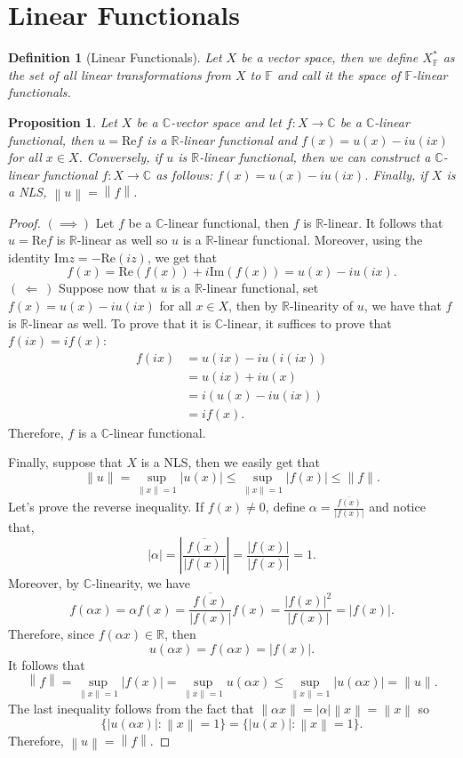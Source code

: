 \documentclass{article}
\newtheorem*{proposition}{Proposition}
\newtheorem*{definition}{Definition}
\newcommand{\C}{\mathbb{C}}
\newcommand{\R}{\mathbb{R}}
\newcommand{\F}{\mathbb{F}}
\newcommand{\norm}[1]{\left\lVert#1 \right\rVert}
\newcommand{\abs}[1]{\left\lvert#1 \right\rvert}
\renewcommand{\Im}{\text{Im}}
\renewcommand{\Re}{\text{Re}}
\begin{document}
\section{Linear Functionals}
\begin{definition}[Linear Functionals]
    Let $X$ be a vector space, then we define $X^*_{\F}$ as the set of all linear transformations from $X$ to $\F$ and call it the space of $\F$-linear functionals.
\end{definition}

\begin{proposition}
    Let $X$ be a $\C$-vector space and let $f : X \to \C$ be a $\C$-linear functional, then $u = \Re f$ is a $\R$-linear functional and $f(x) = u(x) - iu(ix)$ for all $x \in X$. Conversely, if $u$ is $\R$-linear functional, then we can construct a $\C$-linear functional $f : X \to \C$ as follows: $f(x) = u(x) - iu(ix)$. Finally, if $X$ is a NLS, $\norm{u} = \norm{f}$.
\end{proposition}

\begin{proof}
    $(\implies)$ Let $f$ be a $\C$-linear functional, then $f$ is $\R$-linear. It follows that $u = \Re f$ is $\R$-linear as well so $u$ is a $\R$-linear functional. Moreover, using the identity $\Im z = - \Re(iz)$, we get that
    $$f(x) = \Re (f(x)) + i \Im (f(x)) = u(x) - i u(ix).$$
    $( \ \Longleftarrow \ )$ Suppose now that $u$ is a $\R$-linear functional, set $f(x) = u(x) - iu(ix)$ for all $x \in X$, then by $\R$-linearity of $u$, we have that $f$ is $\R$-linear as well. To prove that it is $\C$-linear, it suffices to prove that $f(ix) = if(x)$:
    \begin{align*}
        f(ix) &= u(ix) - iu(i(ix)) \\
        &= u(ix) + iu(x) \\
        &= i(u(x) - iu(ix)) \\
        &= if(x).
    \end{align*}
    Therefore, $f$ is a $\C$-linear functional.

    Finally, suppose that $X$ is a NLS, then we easily get that
    $$\|u\| = \sup_{\|x\| = 1}|u(x)| \leq \sup_{\|x\| = 1}|f(x)| \leq \|f\|.$$
    Let's prove the reverse inequality. If $f(x) \neq 0$, define $\alpha = \frac{\overline{f(x)}}{|f(x)|}$ and notice that,
    $$|\alpha| = \abs{\frac{\overline{f(x)}}{|f(x)|}} = \frac{|f(x)|}{|f(x)|} = 1.$$
    Moreover, by $\C$-linearity, we have
    $$f(\alpha x) = \alpha f(x) = \frac{\overline{f(x)}}{|f(x)|}f(x) = \frac{|f(x)|^2}{|f(x)|} = |f(x)|.$$
    Therefore, since $f(\alpha x) \in \R$, then 
    $$u(\alpha x) = f(\alpha x) = |f(x)|.$$
    It follows that
    $$\norm{f} = \sup_{\|x\| = 1}|f(x)| = \sup_{\|x\| = 1} u(\alpha x) \leq \sup_{\|x\| = 1} |u(\alpha x)| = \|u\|.$$
    The last inequality follows from the fact that $\|\alpha x\| = |\alpha| \norm{x} = \norm{x}$ so 
    $$\{|u(\alpha x)| : \norm{x} = 1\} = \{|u(x)| : \norm{x} = 1\}.$$
    Therefore, $\norm{u} = \norm{f}$.
\end{proof}
\end{document}
